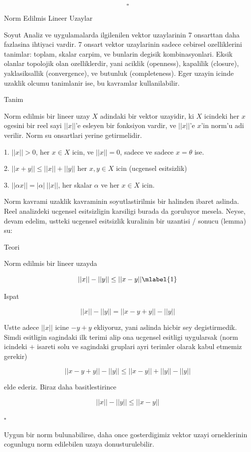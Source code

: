 \documentclass[12pt,fleqn]{article}\usepackage{../common}
\begin{document}
\[ \square \]

Norm Edilmis Lineer Uzaylar

Soyut Analiz ve uygulamalarda ilgilenilen vektor uzaylarinin 7 onsarttan
daha fazlasina ihtiyaci vardir. 7 onsart vektor uzaylarinin sadece cebirsel
ozelliklerini tanimlar: toplam, skalar carpim, ve bunlarin degisik
kombinasyonlari. Eksik olanlar topolojik olan ozelliklerdir, yani aciklik
(openness), kapalilik (closure), yaklasiksallik (convergence), ve butunluk
(completeness). Eger uzayin icinde uzaklik olcumu tanimlanir ise, bu
kavramlar kullanilabilir. 

Tanim

Norm edilmis bir lineer uzay $X$ adindaki bir vektor uzayidir, ki $X$
icindeki her $x$ ogesini bir reel sayi $||x||$'e esleyen bir fonksiyon
vardir, ve $||x||$'e $x$'in norm'u adi verilir. Norm su onsartlari yerine
getirmelidir. 

1. $||x|| > 0$, her $x \in X$ icin, ve $||x|| = 0$, sadece ve sadece $x =
\theta$ ise. 

2. $||x+y|| \le ||x|| + ||y||$ her $x,y \in X$ icin (ucgensel esitsizlik) 

3. $||\alpha x|| = |\alpha| \ ||x||$, her skalar $\alpha$ ve her $x \in X$ icin. 

Norm kavrami uzaklik kavraminin soyutlastirilmis bir halinden ibaret
aslinda. Reel analizdeki ucgensel esitsizligin karsiligi burada da
goruluyor mesela. Neyse, devam edelim, ustteki ucgensel esitsizlik
kuralinin bir uzantisi / sonucu (lemma) su:

Teori 

Norm edilmis bir lineer uzayda 

\[ ||x|| - ||y|| \le ||x-y|| 
\mlabel{1}
\]

Ispat

\[ ||x|| - ||y|| = ||x - y + y|| - ||y||\]

Ustte adece $||x||$ icine $-y+y$ ekliyoruz, yani aslinda hicbir sey
degistirmedik. Simdi esitligin sagindaki ilk terimi alip ona ucgensel
esitligi uygularsak (norm icindeki $+$ isareti solu ve sagindaki gruplari
ayri terimler olarak kabul etmemiz gerekir)

\[ ||x - y + y|| - ||y|| \le
||x - y || + ||y|| - ||y|| 
\]

elde ederiz. Biraz daha basitlestirince

\[ ||x|| - ||y||  \le ||x - y ||  \]

$\square$

Uygun bir norm bulunabilirse, daha once gosterdigimiz vektor uzayi
orneklerinin cogunlugu norm edilebilen uzaya donusturulebilir.
\end{document}
